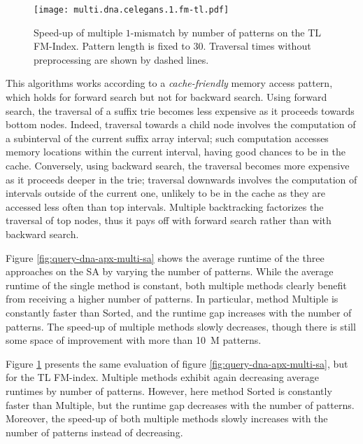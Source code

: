 \begin{figure}[b]
\begin{center}
\caption[Multiple $k$-mismatches speed-up on FM-index]{Speed-up of multiple $1$-mismatch by number of patterns on the TL FM-Index. Pattern length is fixed to 30. Traversal times without preprocessing are shown by dashed lines.}
\label{fig:query-dna-apx-multi-fmtl}
\texttt{[image: multi.dna.celegans.1.fm-tl.pdf]}
\end{center}
\end{figure}

This algorithms works according to a \emph{cache-friendly} memory access pattern, which holds for forward search but not for backward search.
Using forward search, the traversal of a suffix trie becomes less expensive as it proceeds towards bottom nodes.
Indeed, traversal towards a child node involves the computation of a subinterval of the current suffix array interval; such computation accesses memory locations within the current interval, having good chances to be in the cache.
Conversely, using backward search, the traversal becomes more expensive as it proceeds deeper in the trie; traversal downwards involves the computation of intervals outside of the current one, unlikely to be in the cache as they are accessed less often than top intervals.
Multiple backtracking factorizes the traversal of top nodes, thus it pays off with forward search rather than with backward search.

Figure \ref{fig:query-dna-apx-multi-sa} shows the average runtime of the three approaches on the SA by varying the number of patterns.
While the average runtime of the single method is constant, both multiple methods clearly benefit from receiving a higher number of patterns.
In particular, method Multiple is constantly faster than Sorted, and the runtime gap increases with the number of patterns.
The speed-up of multiple methods slowly decreases, though there is still some space of improvement with more than 10~M patterns.

Figure \ref{fig:query-dna-apx-multi-fmtl} presents the same evaluation of figure \ref{fig:query-dna-apx-multi-sa}, but for the TL FM-index.
Multiple methods exhibit again decreasing average runtimes by number of patterns.
However, here method Sorted is constantly faster than Multiple, but the runtime gap decreases with the number of patterns.
Moreover, the speed-up of both multiple methods slowly increases with the number of patterns instead of decreasing.

